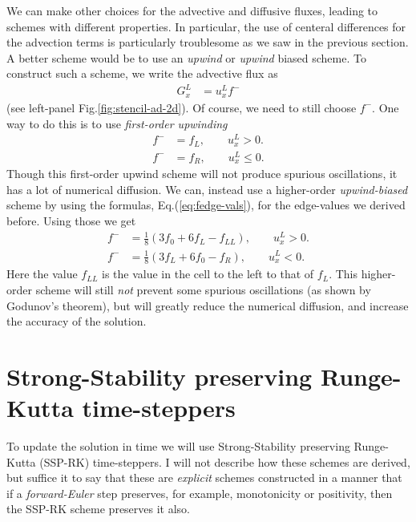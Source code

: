 \documentclass[12pt]{article}
\theoremstyle{definition}
\theoremstyle{definition}
\theoremstyle{definition}
\newcommand{\eqr}[1]{Eq.\thinspace(#1)}
\begin{document}
We can make other choices for the advective and diffusive fluxes,
leading to schemes with different properties. In particular, the use
of centeral differences for the advection terms is particularly
troublesome as we saw in the previous section. A better scheme would
be to use an \emph{upwind} or \emph{upwind} biased scheme. To
construct such a scheme, we write the advective flux as
\begin{align}
  G_x^L &= u_x^L f^{-}
\end{align}
(see left-panel Fig.\thinspace\ref{fig:stencil-ad-2d}). Of course, we
need to still choose $f^{-}$. One way to do this is to use
\emph{first-order upwinding}
\begin{subequations}
\begin{align}
  f^{-} &= f_L, \qquad u_x^L > 0. \\
  f^{-} &= f_R, \qquad u_x^L \le 0.
\end{align}
\end{subequations}
Though this first-order upwind scheme will not produce spurious
oscillations, it has a lot of numerical diffusion. We can, instead use
a higher-order \emph{upwind-biased} scheme by using the formulas,
\eqr{\ref{eq:fedge-vals}}, for the edge-values we derived
before. Using those we get
\begin{subequations}
\begin{align}
  f^- &= \frac{1}{8} ( 3 f_{0} + 6 f_L - f_{LL} ), \qquad u_x^L > 0. \\
  f^- &= \frac{1}{8} ( 3 f_{L} + 6 f_0 - f_R ), \qquad u_x^L < 0.
\end{align}
\end{subequations}
Here the value $f_{LL}$ is the value in the cell to the left to that
of $f_L$. This higher-order scheme will still \emph{not} prevent some
spurious oscillations (as shown by Godunov's theorem), but will
greatly reduce the numerical diffusion, and increase the accuracy of
the solution.

\section{Strong-Stability preserving Runge-Kutta time-steppers}

To update the solution in time we will use Strong-Stability preserving
Runge-Kutta (SSP-RK) time-steppers. I will not describe how these
schemes are derived, but suffice it to say that these are
\emph{explicit} schemes constructed in a manner that if a
\emph{forward-Euler} step preserves, for example, monotonicity or
positivity, then the SSP-RK scheme preserves it also.
\end{document}
